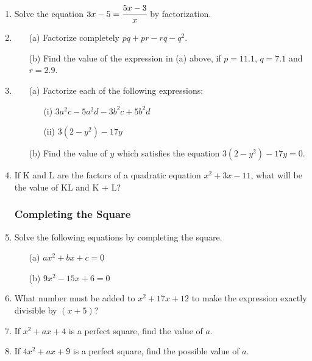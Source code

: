 \begin{enumerate}
	
	
	\item Solve the equation $3x - 5 = \cfrac{5x - 3}{x}$ by factorization.
	
	\item
	\begin{itemize}
	\item[(a)] Factorize completely $pq + pr - rq - q^2$.
	
	\item[(b)] Find the value of the expression in (a) above, if $p = 11.1$, $q = 7.1$ and $r = 2.9$.
	\end{itemize}
	
	\item 
	\begin{itemize}
	\item[(a)] Factorize each of the following expressions:
		\begin{itemize}
		\item[(i)] $3a^2c - 5a^2d - 3b^2c + 5b^2d$
		\item[(ii)] $3(2 - y^2) - 17y$
		\end{itemize}
	\item[(b)] Find the value of $y$ which satisfies the equation $3(2 - y^2) - 17y = 0$.
	\end{itemize}
	
	\item If K and L are the factors of a quadratic equation $x^2 + 3x - 11$, what will be the value of KL and K + L?
	
			\subsubsection{Completing the Square}

	\item Solve the following equations by completing the square.
	\begin{itemize}
	\item[(a)] $ax^2 + bx + c = 0$
	\item[(b)] $9x^2 - 15x + 6 = 0$
	\end{itemize}
	
	\item What number must be added to $x^2 + 17x + 12$ to make the expression exactly divisible by $(x +5)$?
	
	\item If $x^2 + ax + 4$ is a perfect square, find the value of $a$.
	
	\item If $4x^2 + ax + 9$ is a perfect square, find the possible value of $a$.
	

\end{enumerate}
